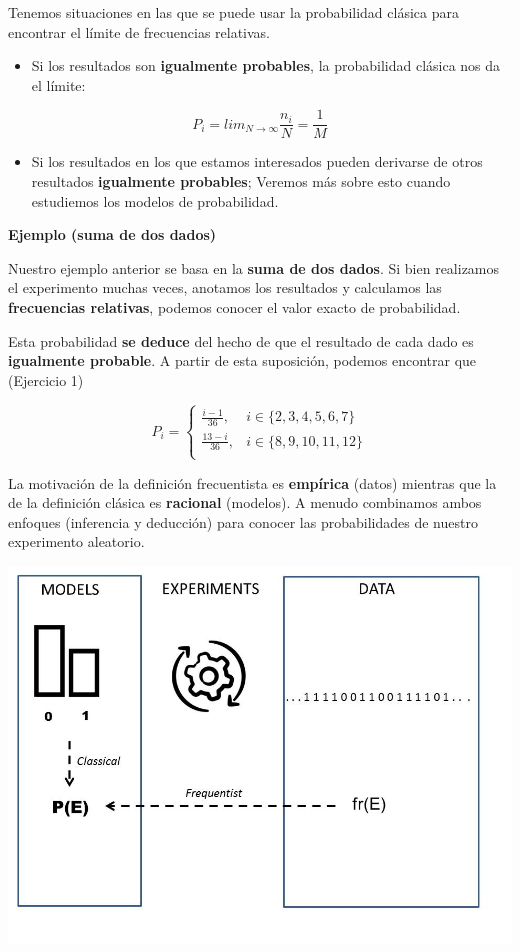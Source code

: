 \documentclass[
]{book}
\providecommand{\tightlist}{%
  \setlength{\itemsep}{0pt}\setlength{\parskip}{0pt}}
\begin{document}
Tenemos situaciones en las que se puede usar la probabilidad clásica para encontrar el límite de frecuencias relativas.

\begin{itemize}
\tightlist
\item
  Si los resultados son \textbf{igualmente probables}, la probabilidad clásica nos da el límite:
\end{itemize}

\[P_i=lim_{N\rightarrow \infty} \frac{n_i}{N}=\frac{1}{M}\]

\begin{itemize}
\tightlist
\item
  Si los resultados en los que estamos interesados pueden derivarse de otros resultados \textbf{igualmente probables}; Veremos más sobre esto cuando estudiemos los modelos de probabilidad.
\end{itemize}

\textbf{Ejemplo (suma de dos dados)}

Nuestro ejemplo anterior se basa en la \textbf{suma de dos dados}.
Si bien realizamos el experimento muchas veces, anotamos los resultados y calculamos las \textbf{frecuencias relativas}, podemos conocer el valor exacto de probabilidad.

Esta probabilidad \textbf{se deduce} del hecho de que el resultado de cada dado es \textbf{igualmente probable}. A partir de esta suposición, podemos encontrar que (Ejercicio 1)

\[
    P_i= 
\begin{cases}
   \frac{i-1}{36},& i \in \{2,3,4,5,6, 7\} \\
\frac{13-i}{36},& i \in \{8,9,10,11,12\} \\ 
\end{cases}
\]

La motivación de la definición frecuentista es \textbf{empírica} (datos) mientras que la de la definición clásica es \textbf{racional} (modelos). A menudo combinamos ambos enfoques (inferencia y deducción) para conocer las probabilidades de nuestro experimento aleatorio.

\includegraphics{./figures/prob.JPG}
\end{document}
